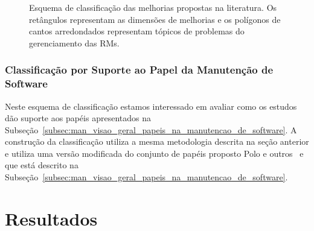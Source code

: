 
\begin{figure}[tb] \centering
    \caption{Esquema de classificação das melhorias propostas na literatura. Os
        retângulos representam as dimensões de melhorias e os polígonos de
        cantos arredondados representam tópicos de problemas do gerenciamento
        das RMs.}\label{fig:diagrama-esquema-dimensao-melhorias}
\end{figure}

\subsubsection{Classificação por Suporte ao Papel da Manutenção de Software}\label{subsubsec:map-esquema-suporte-papel-man}

Neste esquema de classificação estamos interessado em avaliar como os estudos
dão suporte aos papéis apresentados na
Subseção~\ref{subsec:man_visao_geral_papeis_na_manutencao_de_software}. A
construção da classificação utiliza a mesma metodologia descrita na seção
anterior e utiliza uma versão modificada do conjunto de papéis proposto Polo e
outros~\cite{Polo1999} e que está descrito na
Subseção~\ref{subsec:man_visao_geral_papeis_na_manutencao_de_software}.

\section{Resultados}\label{sec:mapeamento_resultados}

